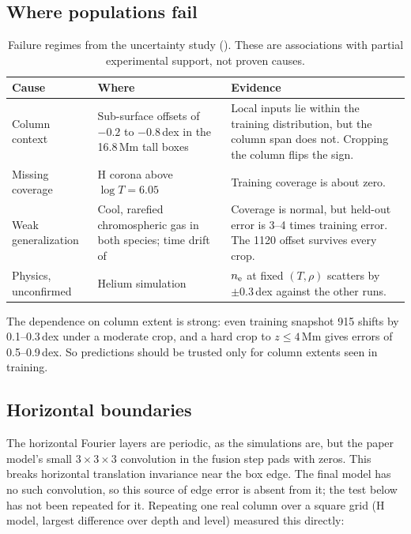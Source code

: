 \subsection{Where populations fail}
\begin{table}[H]\centering\small
\begin{tabularx}{\linewidth}{lYY}
\toprule
Cause&Where&Evidence\\\midrule
Column context&Sub-surface offsets of $-0.2$ to $-0.8$\,dex in the 16.8\,Mm tall boxes&Local inputs lie within the training distribution, but the column span does not. Cropping the column flips the sign.\\
Missing coverage&H corona above $\log T=6.05$&Training coverage is about zero.\\
Weak generalization&Cool, rarefied chromospheric gas in both species; time drift of &Coverage is normal, but held-out error is 3--4 times training error. The  1120 offset survives every crop.\\
Physics, unconfirmed&Helium simulation&$n_{\rm e}$ at fixed $(T,\rho)$ scatters by $\pm0.3$\,dex against the other runs.\\\bottomrule
\end{tabularx}
\caption{Failure regimes from the uncertainty study (). These are associations with partial experimental support, not proven causes.}
\end{table}

The dependence on column extent is strong: even training snapshot  915 shifts by 0.1--0.3\,dex under a moderate crop, and a hard crop to $z\le4$\,Mm gives errors of 0.5--0.9\,dex. So predictions should be trusted only for column extents seen in training.

\subsection{Horizontal boundaries}
The horizontal Fourier layers are periodic, as the simulations are, but the paper model's small $3\times3\times3$ convolution in the fusion step pads with zeros. This breaks horizontal translation invariance near the box edge. The final model has no such convolution, so this source of edge error is absent from it; the test below has not been repeated for it. Repeating one real column over a square grid (H model, largest difference over depth and level) measured this directly:

